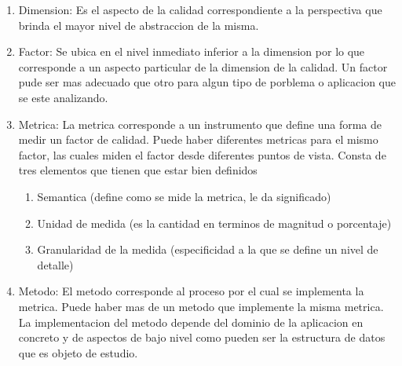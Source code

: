 \documentclass[a4paper,openright,12pt]{report}
\begin{document}
			\begin{enumerate}
				\item Dimension: Es el aspecto de la calidad correspondiente a la perspectiva que brinda el mayor nivel de abstraccion de la misma.\cite{seminario_CSI_2008}
				\item Factor: Se ubica en el nivel inmediato inferior a la dimension por lo que corresponde a un aspecto particular de la dimension de la calidad. Un factor pude ser mas adecuado que otro para algun tipo de porblema o aplicacion que se este analizando.
				\item Metrica: La metrica corresponde a un instrumento que define una forma de medir un factor de calidad. Puede haber diferentes metricas para el mismo factor, las cuales miden el factor desde diferentes puntos de vista. Consta de tres elementos que tienen que estar bien definidos
				\begin{enumerate}
				\item Semantica (define como se mide la metrica, le da significado)
				\item Unidad de medida (es la cantidad en terminos de magnitud o porcentaje)
				\item Granularidad de la medida (especificidad a la que se define un nivel de detalle)
				\end{enumerate}
				\item Metodo: El metodo corresponde al proceso por el cual se implementa la metrica. Puede haber mas de un metodo que implemente la misma metrica. La implementacion del metodo depende del dominio de la aplicacion en concreto y de aspectos de bajo nivel como pueden ser la estructura de datos que es objeto de estudio.
			\end{enumerate}



\end{document}
